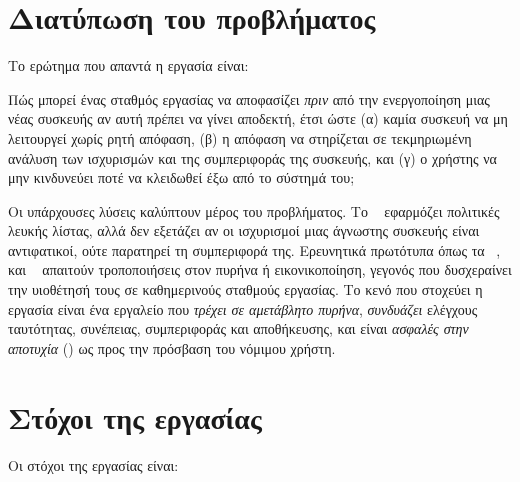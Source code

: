 \section{Διατύπωση του προβλήματος}
\label{sec:problem}

Το ερώτημα που απαντά η εργασία είναι:

\begin{notebox}
Πώς μπορεί ένας σταθμός εργασίας  να αποφασίζει \emph{πριν} από την
ενεργοποίηση μιας νέας συσκευής  αν αυτή πρέπει να γίνει αποδεκτή, έτσι
ώστε (α) καμία συσκευή να μη λειτουργεί χωρίς ρητή απόφαση, (β) η απόφαση να
στηρίζεται σε τεκμηριωμένη ανάλυση των ισχυρισμών και της συμπεριφοράς της
συσκευής, και (γ) ο χρήστης να μην κινδυνεύει ποτέ να κλειδωθεί έξω από το
σύστημά του;
\end{notebox}

Οι υπάρχουσες λύσεις καλύπτουν μέρος του προβλήματος. Το ~\cite{usbguard}
εφαρμόζει πολιτικές λευκής λίστας, αλλά δεν εξετάζει αν οι ισχυρισμοί μιας
άγνωστης συσκευής είναι αντιφατικοί, ούτε παρατηρεί τη συμπεριφορά της. Ερευνητικά
πρωτότυπα όπως τα ~\cite{tian2015goodusb}, ~\cite{tian2016usbfilter}
και ~\cite{angel2016cinch} απαιτούν τροποποιήσεις στον πυρήνα ή
εικονικοποίηση, γεγονός που δυσχεραίνει την υιοθέτησή τους σε καθημερινούς
σταθμούς εργασίας. Το κενό που στοχεύει η εργασία είναι ένα εργαλείο που
\emph{τρέχει σε αμετάβλητο πυρήνα}, \emph{συνδυάζει} ελέγχους ταυτότητας,
συνέπειας, συμπεριφοράς και αποθήκευσης, και είναι \emph{ασφαλές στην αποτυχία}
() ως προς την πρόσβαση του νόμιμου χρήστη.

\section{Στόχοι της εργασίας}
\label{sec:goals}

Οι στόχοι της εργασίας είναι:

